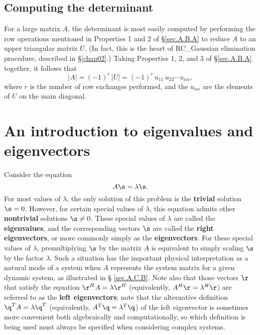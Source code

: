 \subsection{Computing the determinant}\label{sec.A.B.B}

For a large matrix $A$, the determinant is most easily computed by
performing the row operations mentioned in Properties 1 and 2
of \S \ref{sec.A.B.A} to reduce $A$ to an upper triangular
matrix $U$.  (In fact, this is the heart of RC_Gaussian elimination
procedure, described in \S \ref{chap02}.)  Taking Properties 1, 2, and
3 of \S \ref{sec.A.B.A} together, it follows that
\begin{equation*}
|A| = (-1)^r\,|U| = (-1)^r\,u_{11}\,u_{22}\cdots u_{nn},
\end{equation*}
where $r$ is the number of row exchanges performed, and the
$u_{\kappa\kappa}$ are the elements of $U$ on the main
diagonal.  

\section{An introduction to eigenvalues and eigenvectors}\label{sec.A.C}

Consider the equation
\begin{equation}
A\s = \lambda \s.
\label{emodedef}
\end{equation}
For most values of $\lambda$, the only solution of this problem is the
{\bf trivial} solution $\s=0$.  However, for certain special values of
$\lambda$, this equation admits other {\bf nontrivial} solutions $\s\ne
0$.  These special values of $\lambda$ are called the {\bf
eigenvalues}, and the corresponding vectors $\s$ are called the {\bf
right eigenvectors}, or more commonly simply as the {\bf
eigenvectors}.  For these special values of $\lambda$, premultiplying
$\s$ by the matrix $A$ is equivalent to simply scaling $\s$ by the
factor $\lambda$.  Such a situation has the important physical
interpretation as a natural mode of a system when $A$ represents the
system matrix for a given dynamic system, as illustrated in \S
\ref{sec.A.C.B}.  Note also that those vectors $\r$ that satisfy the
equation $\r^{H} A = \lambda \r^{H}$ (equivalently, $A^{H}\r=\lambda^{H} \r$) are referred to as the {\bf left eigenvectors};
note that the alternative definition $\q^{T} A = \lambda \q^{T}$  (equivalently, $A^{T}\q=\lambda^{T} \q$)
of the left eigenvector is sometimes more convenient both algebraically and computationally,
so which definition is being used must always be specified when considering complex systems.

